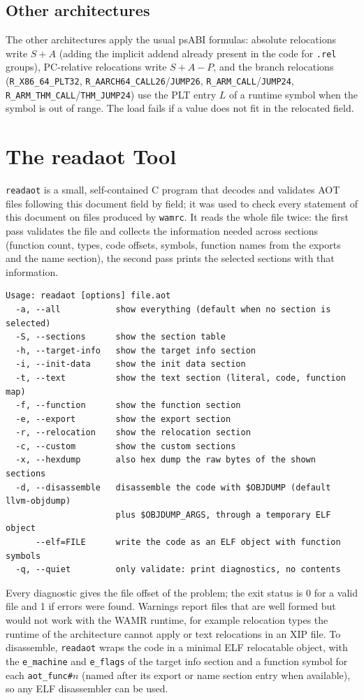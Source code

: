 \documentclass{article}
\begin{document}
\subsection{Other architectures}
The other architectures apply the usual psABI formulas: absolute relocations write $S + A$ (adding the implicit addend already present in the code for \verb|.rel| groups), PC-relative relocations write $S + A - P$, and the branch relocations (\verb|R_X86_64_PLT32|, \verb|R_AARCH64_CALL26|/\verb|JUMP26|, \verb|R_ARM_CALL|/\verb|JUMP24|, \verb|R_ARM_THM_CALL|/\verb|THM_JUMP24|) use the PLT entry $L$ of a runtime symbol when the symbol is out of range.
The load fails if a value does not fit in the relocated field.

\section{The readaot Tool}
\label{sec:readaot}
\texttt{readaot} is a small, self-contained C program that decodes and validates AOT files following this document field by field; it was used to check every statement of this document on files produced by \texttt{wamrc}.
It reads the whole file twice: the first pass validates the file and collects the information needed across sections (function count, types, code offsets, symbols, function names from the exports and the name section), the second pass prints the selected sections with that information.

\begin{verbatim}
Usage: readaot [options] file.aot
  -a, --all           show everything (default when no section is selected)
  -S, --sections      show the section table
  -h, --target-info   show the target info section
  -i, --init-data     show the init data section
  -t, --text          show the text section (literal, code, function map)
  -f, --function      show the function section
  -e, --export        show the export section
  -r, --relocation    show the relocation section
  -c, --custom        show the custom sections
  -x, --hexdump       also hex dump the raw bytes of the shown sections
  -d, --disassemble   disassemble the code with $OBJDUMP (default llvm-objdump)
                      plus $OBJDUMP_ARGS, through a temporary ELF object
      --elf=FILE      write the code as an ELF object with function symbols
  -q, --quiet         only validate: print diagnostics, no contents
\end{verbatim}

Every diagnostic gives the file offset of the problem; the exit status is 0 for a valid file and 1 if errors were found.
Warnings report files that are well formed but would not work with the WAMR runtime, for example relocation types the runtime of the architecture cannot apply or text relocations in an XIP file.
To disassemble, \texttt{readaot} wraps the code in a minimal ELF relocatable object, with the \verb|e_machine| and \verb|e_flags| of the target info section and a function symbol for each \verb|aot_func#|$n$ (named after its export or name section entry when available), so any ELF disassembler can be used.

\printbibliography
\end{document}
